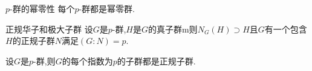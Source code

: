 \begin{corollary}{$p$-群的幂零性}{}
	每个$p$-群都是幂零群.
\end{corollary}

\begin{proposition}{正规华子和极大子群}{}
	设$G$是$p$-群,$H$是$G$的真子群m则$N_{G}\left(H\right)\supset H$且$G$有一个包含$H$的正规子群$N$满足$\left(G:N\right)=p$.
\end{proposition}

\begin{corollary}{}{}
	设$G$是$p$-群,则$G$的每个指数为$p$的子群都是正规子群.
\end{corollary}




























































































